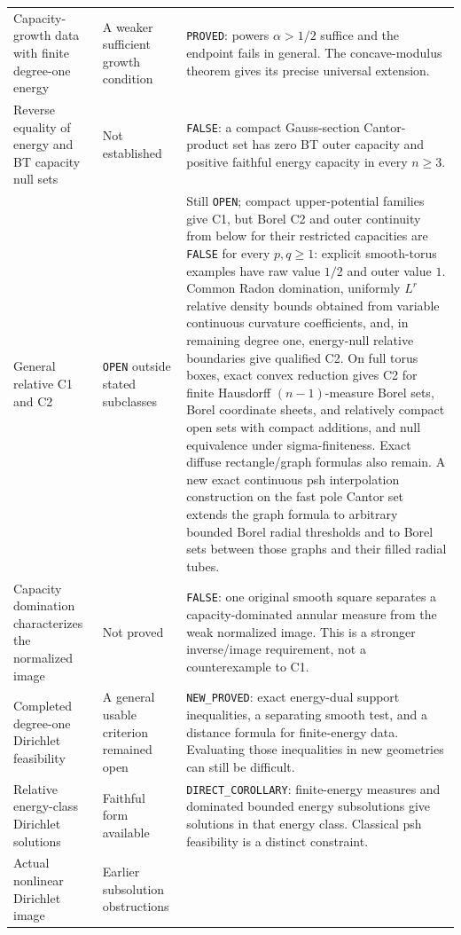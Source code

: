 \documentclass[11pt,a4paper]{article}
\numberwithin{equation}{section}
\theoremstyle{definition}
\theoremstyle{remark}
\begin{document}
\begin{longtable}{@{}p{}p{}p{}@{}}
Capacity-growth data with finite degree-one energy & A weaker
sufficient growth condition & \texttt{PROVED}: powers
$\alpha>1/2$ suffice and the endpoint fails in general. The
concave-modulus theorem gives its precise universal extension.\\[4pt]
Reverse equality of energy and BT capacity null sets & Not
established & \texttt{FALSE}: a compact Gauss-section
Cantor-product set has zero BT outer capacity and positive faithful
energy capacity in every $n\ge3$.\\[4pt]
General relative C1 and C2 & \texttt{OPEN} outside stated
subclasses & Still \texttt{OPEN}; compact upper-potential families give C1, but
Borel C2 and outer continuity from below for their restricted capacities
are \texttt{FALSE} for every $p,q\ge1$: explicit smooth-torus examples have raw value
$1/2$ and outer value $1$. Common
Radon domination, uniformly $L^r$ relative density bounds obtained
from variable continuous curvature coefficients, and, in remaining degree one, energy-null
relative boundaries give qualified C2.
On full torus boxes, exact convex reduction gives C2 for finite
Hausdorff $(n-1)$-measure Borel sets, Borel coordinate sheets,
and relatively compact open sets with compact additions,
and null equivalence under sigma-finiteness. Exact diffuse rectangle/graph formulas also remain. A new exact
continuous psh interpolation construction on the fast pole Cantor set
extends the graph formula to arbitrary bounded Borel radial thresholds
and to Borel sets between those graphs and their filled radial tubes.\\[4pt]
Capacity domination characterizes the normalized image & Not
proved & \texttt{FALSE}: one original smooth square separates a
capacity-dominated annular measure from the weak normalized image.
This is a stronger inverse/image requirement, not a counterexample to C1.\\[4pt]
Completed degree-one Dirichlet feasibility & A general usable
criterion remained open & \texttt{NEW\_PROVED}: exact energy-dual
support inequalities, a separating smooth test, and a distance
formula for finite-energy data. Evaluating those inequalities in
new geometries can still be difficult.\\[4pt]
Relative energy-class Dirichlet solutions & Faithful form available &
\texttt{DIRECT\_COROLLARY}: finite-energy measures and dominated
bounded energy subsolutions give solutions in that energy class.
Classical psh feasibility is a distinct constraint.\\[4pt]
Actual nonlinear Dirichlet image & Earlier subsolution obstructions

\end{longtable}
\end{document}
